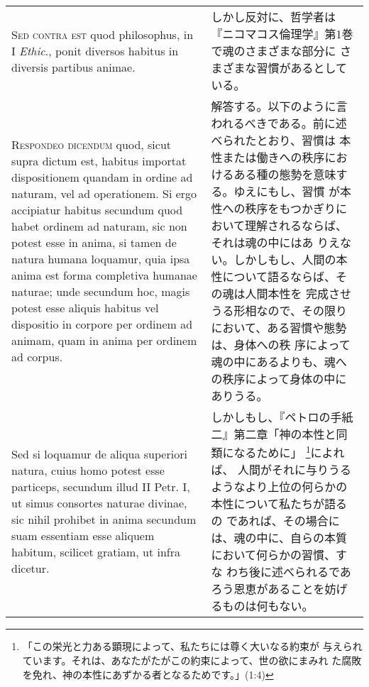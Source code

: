 \documentclass[10pt]{jsarticle} %
\begin{document}
\begin{longtable}{p{21em}p{21em}}
\\



{\scshape Sed contra est} quod philosophus, in I {\itshape Ethic}., ponit diversos habitus
in diversis partibus animae.

&

しかし反対に、哲学者は『ニコマコス倫理学』第1巻で魂のさまざまな部分に
さまざまな習慣があるとしている。

\\



{\scshape Respondeo dicendum} quod, sicut supra dictum est, habitus importat
dispositionem quandam in ordine ad naturam, vel ad operationem. Si
ergo accipiatur habitus secundum quod habet ordinem ad naturam, sic
non potest esse in anima, si tamen de natura humana loquamur, quia
ipsa anima est forma completiva humanae naturae; unde secundum hoc,
magis potest esse aliquis habitus vel dispositio in corpore per
ordinem ad animam, quam in anima per ordinem ad corpus. 

&

解答する。以下のように言われるべきである。前に述べられたとおり、習慣は
本性または働きへの秩序におけるある種の態勢を意味する。ゆえにもし、習慣
が本性への秩序をもつかぎりにおいて理解されるならば、それは魂の中にはあ
りえない。しかしもし、人間の本性について語るならば、その魂は人間本性を
完成させうる形相なので、その限りにおいて、ある習慣や態勢は、身体への秩
序によって魂の中にあるよりも、魂への秩序によって身体の中にありうる。

\\

Sed si
loquamur de aliqua superiori natura, cuius homo potest esse particeps,
secundum illud II Petr. I, ut simus consortes naturae divinae, sic
nihil prohibet in anima secundum suam essentiam esse aliquem habitum,
scilicet gratiam, ut infra dicetur. 

&

しかしもし、『ペトロの手紙二』第二章「神の本性と同類になるために」
\footnote{「この栄光と力ある顕現によって、私たちには尊く大いなる約束が
与えられています。それは、あなたがたがこの約束によって、世の欲にまみれ
た腐敗を免れ、神の本性にあずかる者となるためです。」(1:4) }によれば、
人間がそれに与りうるようなより上位の何らかの本性について私たちが語るの
であれば、その場合には、魂の中に、自らの本質において何らかの習慣、すな
わち後に述べられるであろう恩恵があることを妨げるものは何もない。

\\


\end{longtable}
\end{document}
